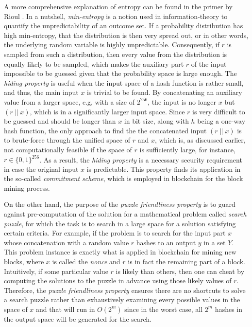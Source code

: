 A more comprehensive explanation of entropy can be found in the primer by Rioul \cite{rioul2018primer}. In a nutshell, \textit{min-entropy} is a notion used in information-theory to quantify the unpredictability of an outcome set. If a probability distribution has high min-entropy, that the distribution is then very spread out, or in other words, the underlying random variable is highly unpredictable. Consequently, if $r$ is sampled from such a distribution, then every value from the distribution is equally likely to be sampled, which makes the auxiliary part $r$ of the input impossible to be guessed given that the probability space is large enough. The \textit{hiding property} is useful when the input space of a hash function is rather small, and thus, the main input $x$ is trivial to be found. By concatenating an auxiliary value from a larger space, e.g, with a size of $2^{256}$, the input is no longer $x$ but $(r \parallel x)$, which is in a significantly larger input space. Since $r$ is very difficult to be guessed and should be longer than $x$ in bit size, along with $h$ being a one-way hash function, the only approach to find the the concatenated input $(r \parallel x)$ is to brute-force through the unified space of $r$ and $x$, which is, as discussed earlier, not computationally feasible if the space of $r$ is sufficiently large, for instance, $r \in \{0,1\}^{256}$. As a result, the \textit{hiding property} is a necessary security requirement in case the original input $x$ is predictable. This property finds its application in the so-called \textit{commitment scheme}, which is employed in blockchain for the block mining process.

On the other hand, the purpose of the \textit{puzzle friendliness property} is to guard against pre-computation of the solution for a mathematical problem called \textit{search puzzle}, for which the task is to search in a large space for a solution satisfying certain criteria. For example, if the problem is to search for the input part $x$ whose concatenation with a random value $r$ hashes to an output $y$ in a set $Y$. This problem instance is exactly what is applied in blockchain for mining new blocks, where $x$ is called the \textit{nonce} and $r$ is in fact the remaining part of a block. Intuitively, if some particular value $r$ is likely than others, then one can cheat by computing the solutions to the puzzle in advance using those likely values of $r$. Therefore, the \textit{puzzle friendliness property} ensures there are no shortcuts to solve a search puzzle rather than exhaustively examining every possible values in the space of $x$ and that will run in $O(2^m)$ since in the worst case, all $2^m$ hashes in the output space will be generated for the search.

